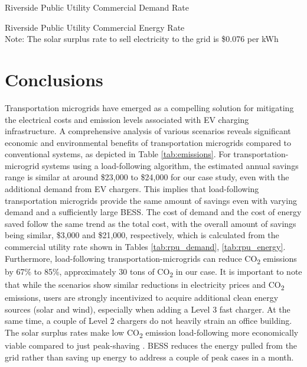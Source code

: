 \documentclass[conference, usletter]{IEEEtran}
\begin{document}
%		
%		
\begin{table}[t]
\caption{Riverside Public Utility Commercial Demand Rate \cite{rpu_rate}}
\centering

\normalsize
\label{tab:rpu_demand}
\end{table}	
\begin{table}[t]
\caption{Riverside Public Utility Commercial Energy Rate \cite{rpu_rate} \\ Note: The solar surplus rate to sell electricity to the grid is \$0.076 per kWh \cite{rpu_nem}}
\centering

\normalsize
\label{tab:rpu_energy}
\end{table}	
\section{Conclusions}
Transportation microgrids have emerged as a compelling solution for mitigating the electrical costs and emission levels associated with EV charging infrastructure. A comprehensive analysis of various scenarios reveals significant economic and environmental benefits of transportation microgrids compared to conventional systems, as depicted in  Table \ref{tab:emissions}. For transportation-microgrid systems using a load-following algorithm, the estimated annual savings range is similar at around \$23,000 to \$24,000 for our case study, even with the additional demand from EV chargers. This implies that load-following transportation microgrids provide the same amount of savings even with varying demand and a sufficiently large BESS. The cost of demand and the cost of energy saved follow the same trend as the total cost, with the overall amount of savings being similar, \$3,000 and \$21,000, respectively, which is calculated from the commercial utility rate shown in Tables \ref{tab:rpu_demand}, \ref{tab:rpu_energy}.
Furthermore, load-following transportation-microgrids can reduce CO\textsubscript{2} emissions by 67\% to 85\%, approximately 30 tons of CO\textsubscript{2} in our case. It is important to note that while the scenarios show similar reductions in electricity prices and CO\textsubscript{2} emissions, users are strongly incentivized to acquire additional clean energy sources (solar and wind), especially when adding a Level 3 fast charger. At the same time, a couple of Level 2 chargers do not heavily strain an office building. The solar surplus rates make low CO\textsubscript{2} emission load-following more economically viable compared to just peak-shaving \cite{rpu_nem}. BESS reduces the energy pulled from the grid rather than saving up energy to address a couple of peak cases in a month.
\end{document}
